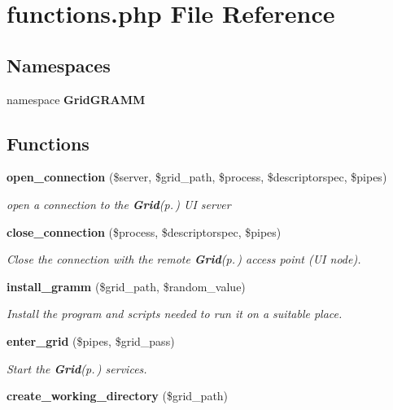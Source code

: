 \section{functions.php File Reference}
\label{functions_8php}
\subsection*{Namespaces}
\begin{CompactItemize}
\item 
namespace {\bf Grid\-GRAMM}
\end{CompactItemize}
\subsection*{Functions}
\begin{CompactItemize}
\item 
{\bf open\_\-connection} (\$server, \$grid\_\-path, \$process, \$descriptorspec, \$pipes)
\begin{CompactList}\small\item\em open a connection to the {\bf Grid}{\rm (p.\,\pageref{classGrid})} UI server \item\end{CompactList}\item 
{\bf close\_\-connection} (\$process, \$descriptorspec, \$pipes)
\begin{CompactList}\small\item\em Close the connection with the remote {\bf Grid}{\rm (p.\,\pageref{classGrid})} access point (UI node). \item\end{CompactList}\item 
{\bf install\_\-gramm} (\$grid\_\-path, \$random\_\-value)
\begin{CompactList}\small\item\em Install the program and scripts needed to run it on a suitable place. \item\end{CompactList}\item 
{\bf enter\_\-grid} (\$pipes, \$grid\_\-pass)
\begin{CompactList}\small\item\em Start the {\bf Grid}{\rm (p.\,\pageref{classGrid})} services. \item\end{CompactList}\item 
{\bf create\_\-working\_\-directory} (\$grid\_\-path)

\end{CompactItemize}
